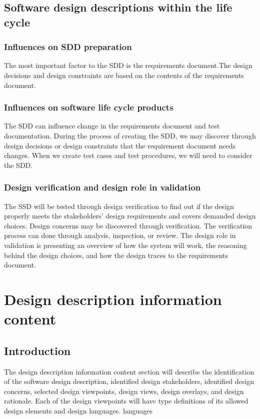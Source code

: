 \documentclass[letterpaper,10pt,draftclsnofoot,onecolumn,]{article}
\begin{document}
\subsection{Software design descriptions within the life cycle}
\subsubsection{Influences on SDD preparation}
The most important factor to the SDD is the requirements document.The design decisions and design constraints are based on the contents of the requirements document.
\subsubsection{Influences on software life cycle products}
The SDD can influence change in the requirements document and test documentation. During the process of creating the SDD, we may discover through design decisions or design constraints that the requirement document needs changes. When we create test cases and test procedures, we will need to consider the SDD.
\subsubsection{Design verification and design role in validation}
The SSD will be tested through design verification to find out if the design properly meets the stakeholders' design requirements and covers demanded design choices. Design concerns may be discovered through verification. The verification process can done through analysis, inspection, or review. The design role in validation is presenting an overview of how the system will work, the reasoning behind the design choices, and  how the design traces to the requirements document. 

\section{Design description information content}
\subsection{Introduction}
The design description information content section will describe the identification of the software design description, identified design stakeholders, identified design concerns, selected design viewpoints, design views, design overlays, and design rationale. Each of the design viewpoints will have type definitions of its allowed design elements and design languages.
languages  
\end{document}
